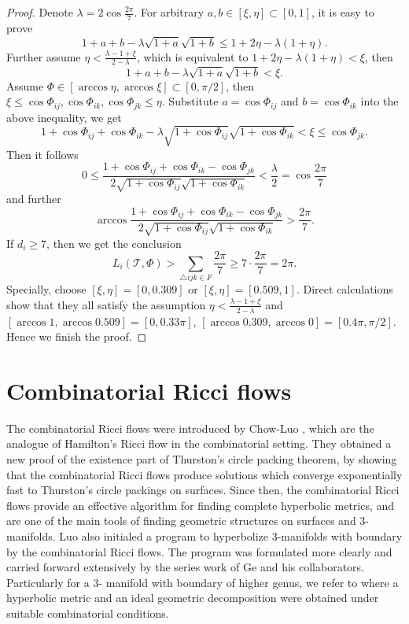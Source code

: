 \documentclass[12pt]{amsart}
\numberwithin{equation}{section}
\begin{document}
\begin{proof}
Denote $\lambda = 2\cos\frac{2\pi}{7}$. For arbitrary $a, b \in [\xi, \eta] \subset [0,1]$, it is easy to prove
\[
1 + a + b - \lambda\sqrt{1 + a}\sqrt{1 + b} \leq 1 + 2\eta - \lambda(1 + \eta).
\]
Further assume $\eta < \frac{\lambda - 1 + \xi}{2 - \lambda}$, which is equivalent to $1 + 2\eta - \lambda(1 + \eta) < \xi$, then
\[
1 + a + b - \lambda\sqrt{1 + a}\sqrt{1 + b} < \xi.
\]
Assume $\Phi \in [\arccos\eta, \arccos\xi] \subset [0,\pi/2]$, then $\xi \leq \cos\Phi_{ij}, \cos\Phi_{ik}, \cos\Phi_{jk} \leq \eta$. Substitute $a = \cos\Phi_{ij}$
and $b = \cos\Phi_{ik}$ into the above inequality, we get
\[
1 + \cos\Phi_{ij} + \cos\Phi_{ik} - \lambda\sqrt{1 + \cos\Phi_{ij}}\sqrt{1 + \cos\Phi_{ik}} < \xi \leq \cos\Phi_{jk}.
\]
Then it follows
\[
0 \leq \frac{1 + \cos\Phi_{ij} + \cos\Phi_{ik} - \cos\Phi_{jk}}{2\sqrt{1 + \cos\Phi_{ij}}\sqrt{1 + \cos\Phi_{ik}}} < \frac{\lambda}{2} = \cos\frac{2\pi}{7}
\]
and further
\[
\arccos \frac{1 + \cos\Phi_{ij} + \cos\Phi_{ik} - \cos\Phi_{jk}}{2\sqrt{1 + \cos\Phi_{ij}}\sqrt{1 + \cos\Phi_{ik}}} > \frac{2\pi}{7}.
\]
If $d_i \geq 7$, then we get the conclusion
\[
L_i(\mathcal{T},\Phi) > \sum_{\triangle ijk \in F} \frac{2\pi}{7} \geq 7 \cdot \frac{2\pi}{7} = 2\pi.
\]
Specially, choose $[\xi, \eta] = [0, 0.309]$ or $[\xi, \eta] = [0.509, 1]$. Direct calculations show that they all satisfy
the assumption $\eta < \frac{\lambda - 1 + \xi}{2 - \lambda}$ and $[\arccos 1, \arccos 0.509] = [0, 0.33\pi]$, $[\arccos 0.309, \arccos 0] = [0.4\pi, \pi/2]$.
Hence we finish the proof.
\end{proof}

\section{Combinatorial Ricci flows}\label{sec:ricci}

The combinatorial Ricci flows were introduced by Chow-Luo \cite{ChowLuo}, which are the analogue of Hamilton's
Ricci flow in the combinatorial setting. They obtained a new proof of the existence part of Thurston's
circle packing theorem, by showing that the combinatorial Ricci flows produce solutions which converge
exponentially fast to Thurston's circle packings on surfaces. Since then, the combinatorial Ricci flows
provide an effective algorithm for finding complete hyperbolic metrics, and are one of the main tools of
finding geometric structures on surfaces and 3-manifolds. Luo \cite{Luo} also initialed a program to hyperbolize
3-manifolds with boundary by the combinatorial Ricci flows. The program was formulated more clearly
and carried forward extensively by the series work of Ge and his collaborators. Particularly for a 3-
manifold with boundary of higher genus, we refer to \cite{FengGeHua} where a hyperbolic metric and an ideal geometric
decomposition were obtained under suitable combinatorial conditions.
\end{document}
